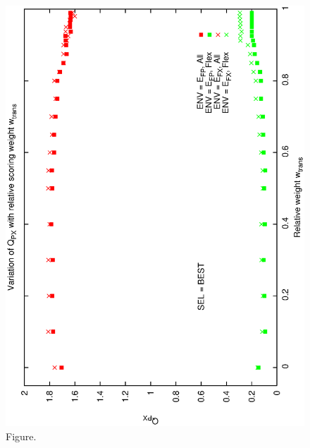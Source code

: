\documentclass[12pt,a4paper]{article}
\begin{document}
\begin{figure}[htbp]
 \begin{center}
  \includegraphics[scale=1.0, angle=0]{figures/cs1_dw1_px_c.eps}
 \end{center}
  \caption[Figure.]
{Figure.}
\end{figure}
\clearpage
\end{document}
